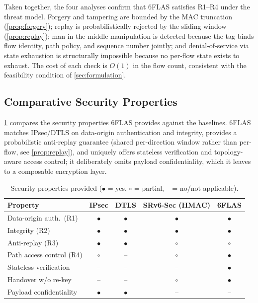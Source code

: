 Taken together, the four analyses confirm that 6FLAS satisfies R1--R4 under the
threat model. Forgery and tampering are bounded by the MAC truncation
(\cref{prop:forgery}); replay is probabilistically rejected by the sliding window (\cref{prop:replay}); man-in-the-middle
manipulation is detected because the tag binds flow identity, path policy, and
sequence number jointly; and denial-of-service via state exhaustion is
structurally impossible because no per-flow state exists to exhaust. The cost of
each check is $O(1)$ in the flow count, consistent with the feasibility
condition of \cref{sec:formulation}.

\subsection{Comparative Security Properties}
\label{sec:sec-compare}

\cref{tab:secprop} compares the security properties 6FLAS provides against the
baselines. 6FLAS matches IPsec/DTLS on data-origin authentication and integrity,
provides a probabilistic anti-replay guarantee (shared per-direction window
rather than per-flow, see \cref{prop:replay}), and uniquely offers stateless
verification and topology-aware access control; it deliberately omits payload
confidentiality, which it leaves to a composable encryption layer.

\begin{table}[t]
\centering
\caption{Security properties provided ($\bullet$ = yes, $\circ$ = partial, --
= no/not applicable).}
\label{tab:secprop}
\renewcommand{\arraystretch}{1.2}
\setlength{\tabcolsep}{4pt}
\begin{tabular}{lcccc}
\toprule
\textbf{Property} & \textbf{IPsec} & \textbf{DTLS} & \textbf{SRv6-Sec (HMAC)} & \textbf{6FLAS} \\
\midrule
Data-origin auth.\ (R1) & $\bullet$ & $\bullet$ & $\bullet$ & $\bullet$ \\
Integrity (R2)          & $\bullet$ & $\bullet$ & $\bullet$ & $\bullet$ \\
Anti-replay (R3)        & $\bullet$ & $\bullet$ & $\circ$   & $\circ$ \\
Path access control (R4)& $\circ$   & --        & $\circ$   & $\bullet$ \\
Stateless verification  & --        & --        & --        & $\bullet$ \\
Handover w/o re-key      & --        & --        & $\circ$   & $\bullet$ \\
Payload confidentiality & $\bullet$ & $\bullet$ & --        & -- \\
\bottomrule
\end{tabular}
\end{table}


